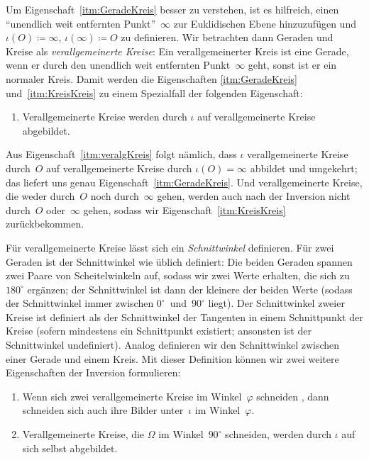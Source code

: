 Um Eigenschaft~\ref{itm:GeradeKreis} besser zu verstehen, ist es hilfreich, einen \enquote{unendlich weit entfernten Punkt}~$\infty$ zur Euklidischen Ebene hinzuzufügen und $\iota(O)\coloneqq \infty$, $\iota(\infty)\coloneqq O$ zu definieren. Wir betrachten dann Geraden und Kreise als \emph{verallgemeinerte Kreise}: Ein verallgemeinerter Kreis ist eine Gerade, wenn er durch den unendlich weit entfernten Punkt~$\infty$ geht, sonst ist er ein normaler Kreis. Damit werden die Eigenschaften \ref{itm:GeradeKreis} und~\ref{itm:KreisKreis} zu einem Spezialfall der folgenden Eigenschaft:
\begin{enumerate}[label={$(\alph*')$}, ref={$(\alph*')$}, start=6]\itshape
	\item \label{itm:veralgKreis}
	Verallgemeinerte Kreise werden durch $\iota$ auf verallgemeinerte Kreise abgebildet.
\end{enumerate}
Aus Eigenschaft~\ref{itm:veralgKreis} folgt nämlich, dass $\iota$ verallgemeinerte Kreise durch~$O$ auf verallgemeinerte Kreise durch $\iota(O)=\infty$ abbildet und umgekehrt; das liefert uns genau Eigenschaft~\ref{itm:GeradeKreis}. Und verallgemeinerte Kreise, die weder durch~$O$ noch durch~$\infty$ gehen, werden auch nach der Inversion nicht durch~$O$ oder~$\infty$ gehen, sodass wir Eigenschaft~\ref{itm:KreisKreis} zurückbekommen.

Für verallgemeinerte Kreise lässt sich ein \emph{Schnittwinkel} definieren. Für zwei Geraden ist der Schnittwinkel wie üblich definiert: Die beiden Geraden spannen zwei Paare von Scheitelwinkeln auf, sodass wir zwei Werte erhalten, die sich zu~$180^\circ$ ergänzen; der Schnittwinkel ist dann der kleinere der beiden Werte (sodass der Schnittwinkel immer zwischen $0^\circ$~und~$90^\circ$ liegt). Der Schnittwinkel zweier Kreise ist definiert als der Schnittwinkel der Tangenten in einem Schnittpunkt der Kreise (sofern mindestens ein Schnittpunkt existiert; ansonsten ist der Schnittwinkel undefiniert). Analog definieren wir den Schnittwinkel zwischen einer Gerade und einem Kreis. Mit dieser Definition können wir zwei weitere Eigenschaften der Inversion formulieren:
\begin{enumerate}[resume]\itshape
	\item \label{itm:Schnitt}
	Wenn sich zwei verallgemeinerte Kreise im Winkel~$\varphi$ schneiden , dann schneiden sich auch ihre Bilder unter~$\iota$ im Winkel~$\varphi$.
	\item \label{itm:Schnitt90}
	Verallgemeinerte Kreise, die $\Omega$ im Winkel~$90^\circ$ schneiden, werden durch $\iota$ auf sich selbst abgebildet.
\end{enumerate}

